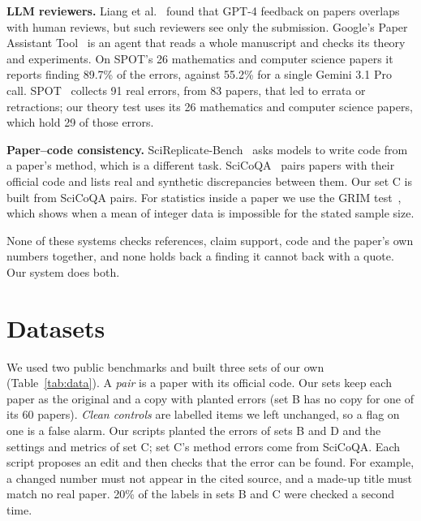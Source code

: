 \documentclass[11pt,a4paper]{article}
\begin{document}
\textbf{LLM reviewers.} Liang et al.~\cite{liang} found that GPT-4 feedback on papers overlaps
with human reviews, but such reviewers see only the submission. Google's Paper Assistant
Tool~\cite{pat} is an agent that reads a whole manuscript and checks its theory and experiments.
On SPOT's 26 mathematics and computer science papers it reports finding 89.7\% of the errors,
against 55.2\% for a single Gemini 3.1 Pro call. SPOT~\cite{spot} collects 91 real errors, from 83
papers, that led to errata or retractions; our theory test uses its 26 mathematics and computer
science papers, which hold 29 of those errors.

\textbf{Paper--code consistency.} SciReplicate-Bench~\cite{scireplicate} asks models to write code
from a paper's method, which is a different task. SciCoQA~\cite{scicoqa} pairs papers with their
official code and lists real and synthetic discrepancies between them. Our set C is built from
SciCoQA pairs. For statistics inside a paper we use the GRIM test~\cite{grim}, which shows when a
mean of integer data is impossible for the stated sample size.

None of these systems checks references, claim support, code and the paper's own numbers
together, and none holds back a finding it cannot back with a quote. Our system does both.

\section{Datasets}
We used two public benchmarks and built three sets of our own (Table~\ref{tab:data}). A
\emph{pair} is a paper with its official code. Our sets keep each paper as the original and a copy with
planted errors (set B has no copy for one of its 60 papers). \emph{Clean controls} are labelled
items we left unchanged, so a flag on one is a false alarm. Our scripts planted the errors of sets
B and D and the settings and metrics of set C; set C's method errors come from SciCoQA. Each
script proposes an edit and then checks that the error can be found. For example, a changed number must not appear in the cited source,
and a made-up title must match no real paper. 20\% of the labels in sets B and C were checked a
second time.
\end{document}
